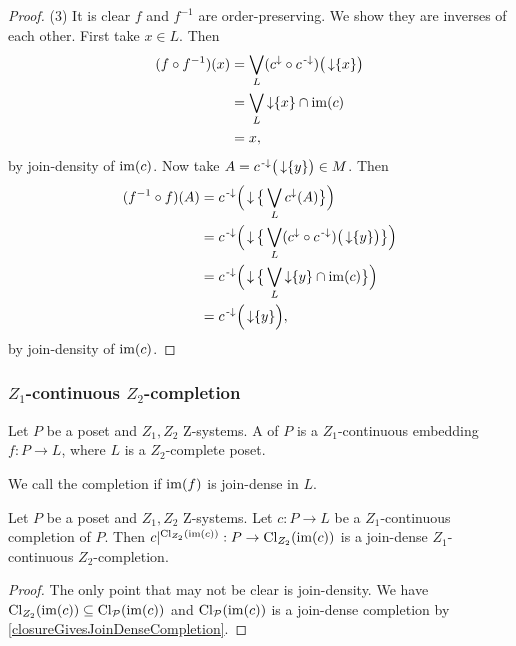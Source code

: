 \begin{proof}
(3) It is clear $f$ and $f^{-1}$ are order-preserving. We show they are inverses of each other. First take $x\in L$. Then
\begin{align*}
(f\circ f^{-1})(x) &= \bigvee_L (c^\downarrow \circ c^{{\text{\hspace{0.15em}-}\downarrow}})\big(\operatorname{\downarrow}\{x\}\big) \\
&= \bigvee_L \operatorname{\downarrow}\{x\}\cap \operatorname{im}(c) \\
&= x,
\end{align*}
by join-density of $\operatorname{im}(c)$. Now take $A = c^{\text{\hspace{0.15em}-}\downarrow}\big(\operatorname{\downarrow}\{y\}\big) \in M$. Then
\begin{align*}
(f^{-1}\circ f)(A) &= c^{\text{\hspace{0.15em}-}\downarrow}\Big(\operatorname{\downarrow}\big\{\bigvee_L c^{\downarrow}(A)\big\}\Big) \\
&= c^{\text{\hspace{0.15em}-}\downarrow}\Big(\operatorname{\downarrow}\big\{\bigvee_L (c^{\downarrow}\circ c^{\text{\hspace{0.15em}-}\downarrow})\big(\operatorname{\downarrow}\{y\}\big)\big\}\Big) \\
&= c^{\text{\hspace{0.15em}-}\downarrow}\Big(\operatorname{\downarrow}\big\{\bigvee_L \operatorname{\downarrow}\{y\} \cap \operatorname{im}(c)\big\}\Big) \\
&= c^{\text{\hspace{0.15em}-}\downarrow}\Big(\operatorname{\downarrow}\{y\}\Big),
\end{align*}
by join-density of $\operatorname{im}(c)$.
\end{proof}

\subsubsection{$Z_1$-continuous $Z_2$-completion}
\begin{definition}
Let $P$ be a poset and $Z_1,Z_2$ $\mathrm{Z}$-systems. A  of $P$ is a $Z_1$-continuous embedding $f: P \to L$, where $L$ is a $Z_2$-complete poset.

We call the completion  if $\operatorname{im}(f)$ is join-dense in $L$.
\end{definition}

\begin{lemma} \label{ZcompletionFromCompletion}
Let $P$ be a poset and $Z_1,Z_2$ $\mathrm{Z}$-systems. Let $c: P\to L$ be a $Z_1$-continuous completion of $P$. Then $c|^{\operatorname{Cl}_{Z_2}(\operatorname{im}(c))}: P \to \operatorname{Cl}_{Z_2}(\operatorname{im}(c))$ is a join-dense $Z_1$-continuous $Z_2$-completion.
\end{lemma}
\begin{proof}
The only point that may not be clear is join-density. We have $\operatorname{Cl}_{Z_2}(\operatorname{im}(c)) \subseteq \operatorname{Cl}_{\operatorname{\mathcal{P}}}(\operatorname{im}(c))$ and $\operatorname{Cl}_{\operatorname{\mathcal{P}}}(\operatorname{im}(c))$ is a join-dense completion by \ref{closureGivesJoinDenseCompletion}.
\end{proof}

